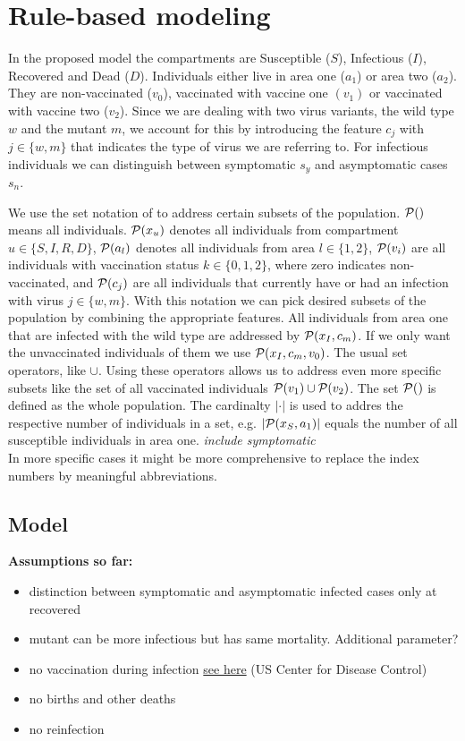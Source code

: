 \section{Rule-based modeling}

In the proposed model the compartments are Susceptible ($S$), Infectious ($I$), Recovered and Dead ($D$). Individuals either live in area one ($a_1$) or area two ($a_2$). They are non-vaccinated ($v_0$), vaccinated with vaccine one $(v_1)$ or vaccinated with vaccine two ($v_2$). Since we are dealing with two virus variants, the wild type $w$ and the mutant $m$, we account for this by introducing the feature $c_j$ with $j \in \{w,m\}$ that indicates the type of virus we are referring to. For infectious individuals we can distinguish between symptomatic $s_y$ and asymptomatic cases $s_n$.
 
We use the set notation of \cite{Waites.2021} to address certain subsets of the population. $\mathcal{P}()$ means all individuals. $\mathcal{P}(x_u)$ denotes all individuals from compartment $u \in \{S, I, R, D \}$, $\mathcal{P}(a_l)$ denotes all individuals from area $l \in \{1,2\}$, $\mathcal{P}(v_i)$ are all individuals with vaccination status $k \in \{0,1,2\}$, where zero indicates non-vaccinated, and $\mathcal{P}(c_j)$ are all individuals that currently have or had an infection with virus $j \in \{w,m\}$. With this notation we can pick desired subsets of the population by combining the appropriate features. All individuals from area one that are infected with the wild type are addressed by $\mathcal{P}(x_I, c_m)$. If we only want the unvaccinated individuals of them we use $\mathcal{P}(x_I, c_m, v_0)$. The usual set operators, like $\cup$. Using these operators allows us to address even more specific subsets like the set of all vaccinated individuals $\mathcal{P}(v_1) \cup \mathcal{P}(v_2)$. The set $\mathcal{P}()$ is defined as the whole population. The cardinalty $|\cdot|$ is used to addres the respective number of individuals in a set, e.g. $|\mathcal{P}(x_S, a_1)|$ equals the number of all susceptible individuals in area one. \textit{include symptomatic}\\

In more specific cases it might be more comprehensive to replace the index numbers by meaningful abbreviations.

\subsection{Model}

\textbf{Assumptions so far:} 
\begin{itemize}
    \item distinction between symptomatic and asymptomatic infected cases only at recovered
    \item mutant can be more infectious but has same mortality. Additional parameter?
    \item no vaccination during infection \href{https://www.cdc.gov/vaccines/covid-19/info-by-product/clinical-considerations.html}{see here} (US Center for Disease Control)
    \item no births and other deaths
    \item no reinfection
\end{itemize}
\vspace{0.5cm}

